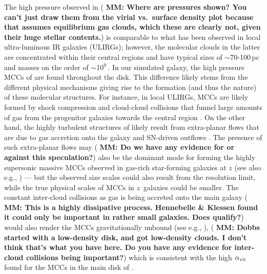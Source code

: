 \IfFileExists{emulateapjlegacy.cls}{\documentclass[iop]{emulateapjlegacy}}{\documentclass[iop]{emulateapj}}
\newcommand{\MM}[1]{({\bf \color{mmcolor} MM: #1})}
\begin{document}
The high pressure observed in \flower \MM{Where are pressures shown?
  You can't just draw them from the virial vs.\ surface density plot
  because that assumes equilibrium gas clouds, which these are clearly
  not, given their huge stellar contents.} is comparable to what has been observed in local ultra-luminous IR galaxies (ULIRGs); however, the molecular clouds in the latter are concentrated within their central regions and have typical sizes of $\sim$70-100\,pc and masses on the order of $\sim$10$^9$\,\Msun \citep{Downes98a, Sakamoto08a}. In our simulated galaxy, the high pressure MCCs of \flower are found throughout the disk. This difference likely stems from the different physical mechanisms giving rise to the formation (and thus the nature) of these molecular structures.
%
For instance, in local ULIRGs, 
  MCCs are likely formed
by shock compression and cloud-cloud collisions 
    that funnel large amounts of gas from the progenitor galaxies
    towards the central region
\citep{Tan00a, Wu18a}.
On the other hand, the highly turbulent structures of \flower likely result from 
extra-planar flows that are due to gas accretion onto the galaxy and SN-driven outflows \citep{gallerani:2018,kohandel:2019}.
The presence of such extra-planar flows may \MM{Do we have any
  evidence for or against this speculation?} also be the 
dominant mode for forming the highly supersonic massive MCCs observed
in gas-rich star-forming galaxies at $z$ (see also e.g.,
\citealt{Swinbank11a}) --- but the observed size scales could also
result from the resolution limit, while the true physical scales of
MCCs in $z$\, galaxies could be smaller.
%
The constant inter-cloud collisions as gas is being accreted onto the
main galaxy \MM{This is a highly dissipative process.  Hennebelle \&
  Klessen found it could only be important in rather small galaxies.
  Does \flower qualify?} would also render
the MCCs 
gravitationally unbound (see e.g., \citealt{Dobbs11a}), \MM{Dobbs
  started with a low-density disk, and got low-density clouds. I don't
  think that's what you have here.  Do you have any evidence for
  inter-cloud collisions being important?} which is
consistent with the high $\alpha_{\rm vir}$ found for the MCCs in the main disk of \flower.
\end{document}
